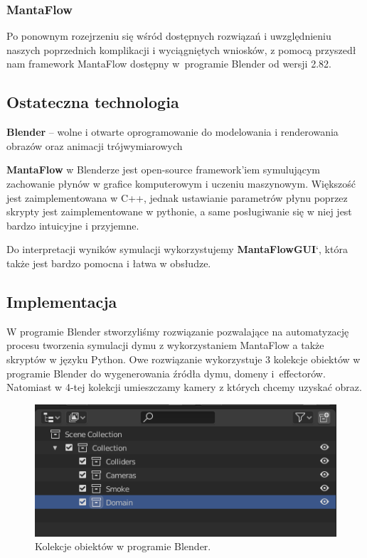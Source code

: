 \documentclass{article}
\begin{document}
	\medskip
	\vspace{4mm}
	\subsubsection{MantaFlow}
	\noindent Po ponownym rozejrzeniu się wśród dostępnych rozwiązań i uwzględnieniu naszych poprzednich komplikacji i wyciągniętych wniosków, z pomocą przyszedł nam framework MantaFlow dostępny w~programie Blender od wersji 2.82. 
	
	\vspace{10mm}
	\subsection{Ostateczna technologia}
	\vspace{2mm}
	\textbf{Blender} – wolne i otwarte oprogramowanie do modelowania i renderowania obrazów oraz animacji trójwymiarowych
	
	\medskip
	\medskip
	\noindent \textbf{MantaFlow} w Blenderze jest open-source framework'iem symulującym zachowanie płynów w grafice komputerowym i uczeniu maszynowym. Większość jest zaimplementowana w C++, jednak ustawianie parametrów płynu poprzez skrypty jest zaimplementowane w pythonie, a same posługiwanie się w niej jest bardzo intuicyjne i przyjemne. 
	
	\medskip
	\medskip
	\noindent Do interpretacji wyników symulacji wykorzystujemy \textbf{MantaFlowGUI}`, która także jest bardzo pomocna i łatwa w obsłudze.
	
	
	\vspace{10mm}
	\subsection{Implementacja}
	\vspace{2mm}
	W programie Blender stworzyliśmy rozwiązanie pozwalające na automatyzację procesu tworzenia symulacji dymu z wykorzystaniem MantaFlow a także skryptów w języku Python. Owe rozwiązanie wykorzystuje 3 kolekcje obiektów w programie Blender do wygenerowania źródła dymu, domeny i~effectorów. Natomiast w 4-tej kolekcji umieszczamy kamery z których chcemy uzyskać obraz. 
	
	\vspace{7mm}
	\begin{figure}[h]
		\centering
		\includegraphics[scale = 1.0]{s1.png}
		\caption{Kolekcje obiektów w programie Blender.}
	\end{figure}
	\vspace{7mm}
	
\end{document}
